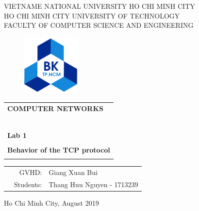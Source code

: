 \documentclass[12pt,a4paper]{article}
\begin{document}
\begin{titlepage}
\begin{center}
VIETNAME NATIONAL UNIVERSITY HO CHI MINH CITY  \\
HO CHI MINH CITY UNIVERSITY OF TECHNOLOGY\\
FACULTY OF COMPUTER SCIENCE AND ENGINEERING
\end{center}

\vspace{1cm}

\begin{figure}[h!]
\begin{center}
\includegraphics[width=3cm]{imgs/hcmut.png}
\end{center}
\end{figure}

\vspace{1cm}


\begin{center}
\begin{tabular}{c}
	\multicolumn{1}{l}{\textbf{{\Large COMPUTER NETWORKS}}}\\
	~~\\
	\hline
	\\
	\multicolumn{1}{l}{\textbf{{\Large Lab 1}}}\\
	\\
	
	\textbf{{\Huge Behavior of the TCP protocol}}\\
	\\
	\hline
\end{tabular}
\end{center}

\vspace{3cm}

\begin{table}[h]
\begin{tabular}{rrl}
\hspace{5 cm} & GVHD: &Giang Xuan Bui\\
                & Students: & Thang Huu Nguyen - 1713239\\
\end{tabular}
\end{table}

\vspace{3cm}

\begin{center}
{\footnotesize Ho Chi Minh City, August 2019}
\end{center}
\end{titlepage}
\end{document}
